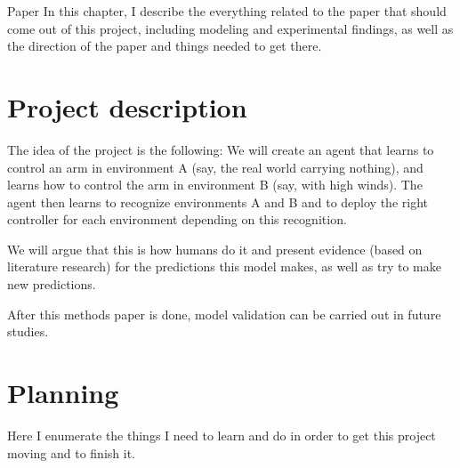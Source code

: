 \documentclass{report}
\begin{document}

\begin{chapter}{Paper}
In this chapter, I describe the everything related to the paper that should come out of this project, including modeling and experimental findings, as well as the direction of the paper and things needed to get there.

\section{Project description}
The idea of the project is the following: We will create an agent that learns to control an arm in environment A (say, the real world carrying nothing), and learns how to control the arm in environment B (say, with high winds). The agent then learns to recognize environments A and B and to deploy the right controller for each environment depending on this recognition.

We will argue that this is how humans do it and present evidence (based on literature research) for the predictions this model makes, as well as try to make new predictions.

After this methods paper is done, model validation can be carried out in future studies.

\section{Planning}
Here I enumerate the things I need to learn and do in order to get this project moving and to finish it.


\end{chapter}
\end{document}
